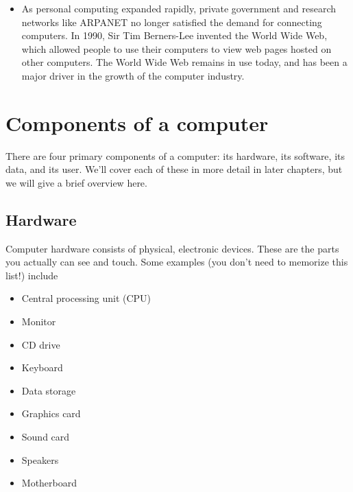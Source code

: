 \begin{itemize}
\begin{marginfigure}
	\caption{The Apple II, a computer built for use by non-professionals, and a precursor of modern personal computers.}
	\label{fig:appleii}
\end{marginfigure}
\item As personal computing expanded rapidly, private government and research networks like ARPANET no longer satisfied the demand for connecting computers. In 1990, Sir Tim Berners-Lee invented the World Wide Web, which allowed people to use their computers to view web pages hosted on other computers. The World Wide Web remains in use today, and has been a major driver in the growth of the computer industry.
\end{itemize}

\section{Components of a computer}

There are four primary components of a computer: its hardware, its software, its data, and its user. We'll cover each of these in more detail in later chapters, but we will give a brief overview here.

\subsection{Hardware}

Computer hardware consists of physical, electronic devices. These are the parts you actually can see and touch. Some examples (you don't need to memorize this list!) include

\begin{itemize}
	\item Central processing unit (CPU)
	\item Monitor
	\item CD drive
	\item Keyboard
	\item Data storage
	\item Graphics card
	\item Sound card
	\item Speakers
	\item Motherboard
\end{itemize}

